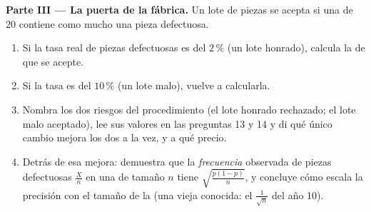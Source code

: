 \begin{problem}
\medskip
\noindent\textbf{Parte III --- La puerta de la fábrica.}
Un lote de piezas se acepta si una  de $20$ contiene como mucho una
pieza defectuosa.
\begin{enumerate}[resume]
  \item Si la tasa real de piezas defectuosas es del $2\,\%$ (un lote
        honrado), calcula la  de que se acepte.
  \item Si la tasa es del $10\,\%$ (un lote malo), vuelve a calcularla.
  \item Nombra los dos riesgos del procedimiento (el lote honrado
        rechazado; el lote malo aceptado), lee sus valores en las preguntas
        13 y 14 y di qué único cambio mejora los dos a la vez, y a qué
        precio.
  \item Detrás de esa mejora: demuestra que la \emph{frecuencia} observada
        de piezas defectuosas $\frac Xn$ en una  de tamaño $n$ tiene
         $\sqrt{\frac{p(1-p)}{n}}$, y concluye cómo escala
        la precisión con el tamaño de la  (una vieja conocida: el
        $\frac{1}{\sqrt n}$ del año 10).
\end{enumerate}


\end{problem}
